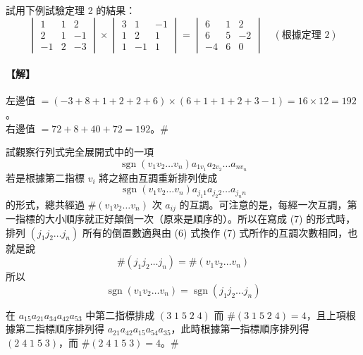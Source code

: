 \begin{example}\label{ex:b6-1-25}
試用下例試驗定理 2 的結果：
\[ \begin{vmatrix}
1 & 1 & 2 \\
2 & 1 & -1 \\
-1 & 2 & -3
\end{vmatrix} \times \begin{vmatrix}
3 & 1 & -1 \\
1 & 2 & 1 \\
1 & -1 & 1
\end{vmatrix} = \begin{vmatrix}
6 & 1 & 2 \\
6 & 5 & -2 \\
-4 & 6 & 0
\end{vmatrix} \quad (\text{根據定理 2}) \]
\end{example}

\paragraph{【解】}
左邊值 $=(-3+8+1+2+2+6)\times(6+1+1+2+3-1) = 16 \times 12 = 192$。\\
右邊值 $=72+8+40+72 = 192$。\hfill$\#$

試觀察行列式完全展開式中的一項
\begin{equation}
\operatorname{sgn}(v_1 v_2 \dots v_n) a_{1v_1} a_{2v_2} \dots a_{nv_n} \label{eq:b6-1-6-6}
\end{equation}
若是根據第二指標 $v_i$ 將之經由互調重新排列使成
\begin{equation}
\operatorname{sgn}(v_1 v_2 \dots v_n) a_{j_1 1} a_{j_2 2} \dots a_{j_n n} \label{eq:b6-1-6-7}
\end{equation}
的形式，總共經過 $\#(v_1 v_2 \dots v_n)$ 次 $a_{ij}$ 的互調。可注意的是，每經一次互調，第一指標的大小順序就正好顛倒一次（原來是順序的）。所以在寫成 (7) 的形式時，排列 $(j_1 j_2 \dots j_n)$ 所有的倒置數適與由 (6) 式換作 (7) 式所作的互調次數相同，也就是說
\[ \#(j_1 j_2 \dots j_n) = \#(v_1 v_2 \dots v_n) \]
所以
\begin{equation}
\operatorname{sgn}(v_1 v_2 \dots v_n) = \operatorname{sgn}(j_1 j_2 \dots j_n) \label{eq:b6-1-6-8}
\end{equation}

\begin{example}\label{ex:b6-1-26}
在 $a_{15} a_{21} a_{34} a_{42} a_{53}$ 中第二指標排成 $(3 \; 1 \; 5 \; 2 \; 4)$ 而 $\#(3 \; 1 \; 5 \; 2 \; 4) = 4$，且上項根據第二指標順序排列得 $a_{21} a_{42} a_{15} a_{54} a_{35}$，此時根據第一指標順序排列得 $(2 \; 4 \; 1 \; 5 \; 3)$，而 $\#(2 \; 4 \; 1 \; 5 \; 3) = 4$。\hfill$\#$
\end{example}

